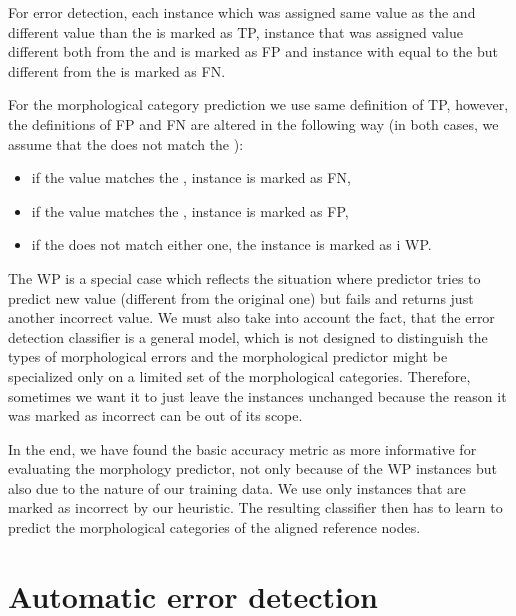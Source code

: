 For error detection, each instance which was assigned same value as the 
and different value than the  is marked as TP, instance
that was assigned value different both from the  and 
is marked as FP and instance with  equal to the 
but different from the  is marked as FN.

For the morphological category prediction we use same definition of TP, however, the definitions
of FP and FN are altered in the following way (in both cases, we assume that the 
does not match the ):
\begin{itemize}
\item if the  value matches the , instance is marked as FN,
\item if the  value matches the , instance is marked as FP,
\item if the  does not match either one, the instance is marked as i WP.
\end{itemize}

The WP is a special case which reflects the situation where predictor tries to predict new value (different
from the original one) but fails and returns just another incorrect value. We must also take into account
the fact, that the error detection classifier is a general model, which is not designed to distinguish
the types of morphological errors and the morphological predictor might be specialized only on a limited
set of the morphological categories. Therefore, sometimes we want it to just leave the 
instances unchanged because the reason it was marked as incorrect can be out of its scope.

In the end, we have found the basic accuracy metric as more informative for evaluating the morphology predictor,
not only because of the WP instances but also due to the nature of our training data. We use only instances
that are marked as incorrect by our heuristic. The resulting classifier then has to learn to predict the
morphological categories of the aligned reference nodes.

\section{Automatic error detection}

